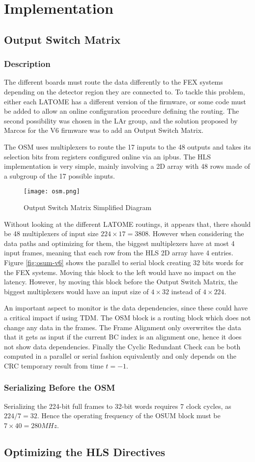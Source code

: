 \chapter{Implementation}\label{ch:implementation}

\section{Output Switch Matrix}\label{sec:osm}
\subsection{Description}
The different boards must route the data differently to the FEX systems depending on the detector region they are connected to. To tackle this problem, either each LATOME has a different version of the firmware, or some code must be added to allow an online configuration procedure defining the routing. The second possibility was chosen in the LAr group, and the solution proposed by Marcos for the V6 firmware was to add an Output Switch Matrix. 

The OSM uses multiplexers to route the 17 inputs to the 48 outputs and takes its selection bits from registers configured online via an ipbus. The HLS implementation is very simple, mainly involving a 2D array with 48 rows made of a subgroup of the 17 possible inputs.

\begin{figure}
    \centering
    \texttt{[image: osm.png]}
    \caption{Output Switch Matrix Simplified Diagram}
    \label{fig:original-vhdl-design}
\end{figure}

Without looking at the different LATOME routings, it appears that, there should be 48 multiplexers of input size \(224\times17=3808\).
However when considering the data paths and optimizing for them, the biggest multiplexers have at most 4 input frames, meaning that each row from the HLS 2D array have 4 entries.
Figure \ref{fig:osum-v6} shows the parallel to serial block creating 32 bits words for the FEX systems. Moving this block to the left would have no impact on the latency. However, by moving this block before the Output Switch Matrix, the biggest multiplexers would have an input size of \(4\times32\) instead of \(4\times224\).

An important aspect to monitor is the data dependencies, since these could have a critical impact if using TDM. The OSM block is a routing block which does not change any data in the frames. The Frame Alignment only overwrites the data that it gets as input if the current BC index is an alignment one, hence it does not show data dependencies. Finally the Cyclic Redundant Check can be both computed in a parallel or serial fashion equivalently and only depends on the CRC temporary result from time \(t=-1\).

\subsection{Serializing Before the OSM}

Serializing the 224-bit full frames to 32-bit words requires 7 clock cycles, as \(224/7=32\). Hence the operating frequency of the OSUM block must be \(7\times40=280MHz\).


\section{Optimizing the HLS Directives}
